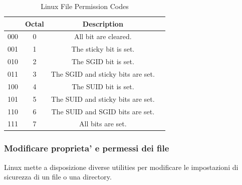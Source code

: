 \begin{table}[]
\centering
\begin{tabular}{cccc}
\hline
\rowcolor[HTML]{C0C0C0} 
\multicolumn{1}{c|}{\cellcolor[HTML]{C0C0C0}\textbf{Binary}} &
\multicolumn{1}{c|}{\cellcolor[HTML]{C0C0C0}\textbf{Octal}} &
\multicolumn{1}{c}{\cellcolor[HTML]{C0C0C0}\textbf{Description}} \\ \hline
000 & 0 & All bit are cleared.                      \\ \hline
001 & 1 & The sticky bit is set.            \\ \hline
010 & 2 & The SGID bit is set.              \\ \hline
011 & 3 & The SGID and sticky bits are set.       \\ \hline
100 & 4 & The SUID bit is set.               \\ \hline
101 & 5 & The SUID and sticky bits are set.        \\ \hline
110 & 6 & The SUID and SGID bits are set.          \\ \hline
111 & 7 & All bits are set.		\\ \hline
\end{tabular}
\caption{Linux File Permission Codes}
\end{table}

\subsubsection{Modificare proprieta' e permessi dei file}\label{chmodchown}
Linux mette a disposizione diverse utilities per modificare le impostazioni di sicurezza di un file o una directory.


